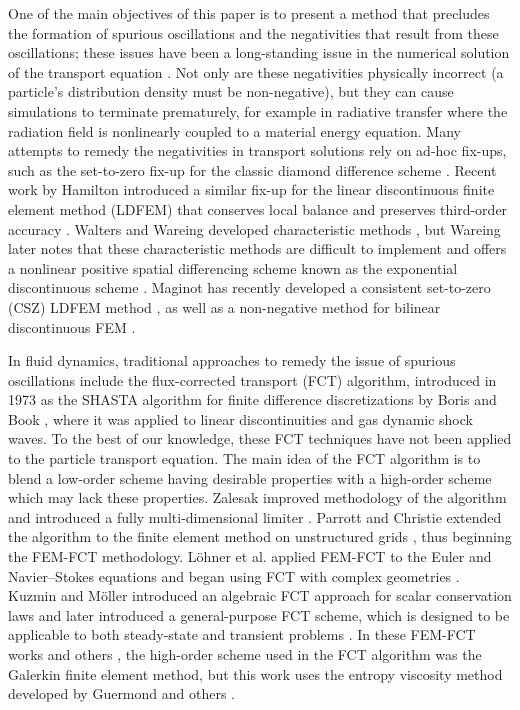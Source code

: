 \documentclass[xchauthor,chkrefs,fixeqskip,GCNS,amsmath,amsthm]{yjcphg}
\theoremstyle{remark}
\begin{document}
One of the main objectives of this paper is to present a method that
precludes the formation of spurious oscillations and the negativities
that result from these oscillations; these issues have been a
long-standing issue in the numerical solution of the transport equation
\cite{lathrop}. Not only are these negativities physically
incorrect (a particle's distribution density must be non-negative), but
they can cause simulations to terminate prematurely, for example in
radiative transfer where the radiation field is nonlinearly coupled to
a material energy equation. Many attempts to remedy the negativities in
transport solutions rely on ad-hoc fix-ups, such as the set-to-zero
fix-up for the classic diamond difference scheme \cite{lewis}.
Recent work by Hamilton introduced a similar fix-up for the linear
discontinuous finite element method (LDFEM) that conserves local balance
and preserves third-order accuracy \cite{hamilton}. Walters and
Wareing developed characteristic methods \cite{walters_NC}, but
Wareing later notes that these characteristic methods are difficult to
implement and offers a nonlinear positive spatial differencing scheme
known as the exponential discontinuous scheme \cite{wareing}.
Maginot has recently developed a consistent set-to-zero (CSZ) LDFEM
method \cite{maginot}, as well as a non-negative method for
bilinear discontinuous FEM
\cite{maginot_mc2015,maginot_2017}.

In fluid dynamics, traditional approaches to remedy the issue of
spurious oscillations include the flux-corrected transport (FCT)
algorithm, introduced in 1973 as the SHASTA algorithm for finite
difference discretizations by Boris and Book \cite{borisbook},
where it was applied to linear discontinuities and gas dynamic shock
waves. To the best of our knowledge, these FCT techniques have not been
applied to the particle transport equation. The main idea of the FCT
algorithm is to blend a low-order scheme having desirable properties
with a high-order scheme which may lack these properties. Zalesak
improved methodology of the algorithm and introduced a fully
multi-dimensional limiter \cite{zalesak}. Parrott and Christie
extended the algorithm to the finite element method on unstructured
grids \cite{parrott}, thus beginning the FEM-FCT methodology.
L\"{o}hner et al. applied FEM-FCT to the Euler and Navier--Stokes
equations and began using FCT with complex geometries
\cite{lohner}. Kuzmin and M\"{o}ller introduced an algebraic FCT
approach for scalar conservation laws \cite{kuzmin_FCT} and later
introduced a general-purpose FCT scheme, which is designed to be
applicable to both steady-state and transient problems
\cite{kuzmin_general}. In these FEM-FCT works and others
\cite{moller_2008,kuzmin_failsafe,kuzmin_closepacking}, the high-order
scheme used in the FCT algorithm was the Galerkin finite element method,
but this work uses the entropy viscosity method developed by Guermond
and others \cite{guermond_ev}.
\end{document}
